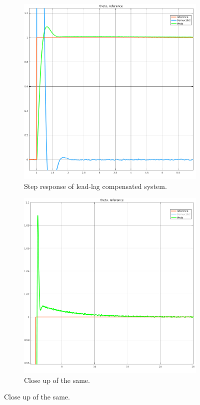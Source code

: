 \documentclass[11pt,a4paper]{article}
\begin{document}
\begin{figure}[!htbp]
	\centering
	\begin{subfigure}{.5\textwidth}
		\centering
		\includegraphics[width = \textwidth]{imglab/lab4sol_trajleadlagstep.png}
		\caption{Step response of lead-lag compensated system.}
	\end{subfigure}%
	\begin{subfigure}{.5\textwidth}
		\centering
		\includegraphics[width = \textwidth]{imglab/lab4sol_trajleadlagclose.png}
		\caption{Close up of the same.}	
	\end{subfigure}
\end{figure}
\end{document}
